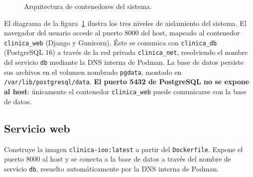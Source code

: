 \documentclass[12pt,a4paper]{article}
\begin{document}
\begin{figure}[H]
\caption{Arquitectura de contenedores del sistema.}
\label{fig:arquitectura}
\end{figure}

El diagrama de la figura~\ref{fig:arquitectura} ilustra los tres niveles de aislamiento del sistema. El navegador del usuario accede al puerto 8000 del host, mapeado al contenedor \texttt{clinica\_web} (Django y Gunicorn). Éste se comunica con \texttt{clinica\_db} (PostgreSQL 16) a través de la red privada \texttt{clinica\_net}, resolviendo el nombre del servicio \texttt{db} mediante la DNS interna de Podman. La base de datos persiste sus archivos en el volumen nombrado \texttt{pgdata}, montado en \texttt{/var/lib/postgresql/data}. \textbf{El puerto 5432 de PostgreSQL no se expone al host}: únicamente el contenedor \texttt{clinica\_web} puede comunicarse con la base de datos.

\subsection{Servicio web}

Construye la imagen \texttt{clinica-ioo:latest} a partir del \texttt{Dockerfile}. Expone el puerto 8000 al host y se conecta a la base de datos a través del nombre de servicio \texttt{db}, resuelto automáticamente por la DNS interna de Podman.
\end{document}
